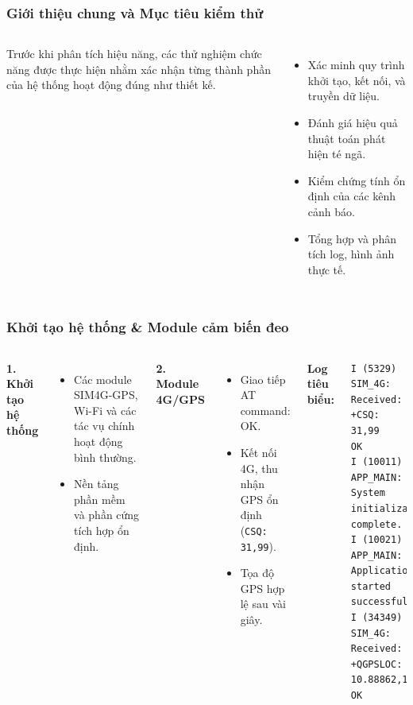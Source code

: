 
\begin{frame}[t]
\frametitle{Giới thiệu chung và Mục tiêu kiểm thử}
\begin{columns}[T]
    Trước khi phân tích hiệu năng, các thử nghiệm chức năng được thực hiện nhằm xác nhận từng thành phần của hệ thống hoạt động đúng như thiết kế.
    \begin{itemize}
        \item Xác minh quy trình khởi tạo, kết nối, và truyền dữ liệu.
        \item Đánh giá hiệu quả thuật toán phát hiện té ngã.
        \item Kiểm chứng tính ổn định của các kênh cảnh báo.
        \item Tổng hợp và phân tích log, hình ảnh thực tế.
    \end{itemize}
\end{columns}
\end{frame}

\begin{frame}[t,fragile]
\frametitle{Khởi tạo hệ thống \& Module cảm biến đeo}
\begin{columns}[T]
    \textbf{1. Khởi tạo hệ thống}
    \begin{itemize}
        \item Các module SIM4G-GPS, Wi-Fi và các tác vụ chính hoạt động bình thường.
        \item Nền tảng phần mềm và phần cứng tích hợp ổn định.
    \end{itemize}
    \vspace{0.2cm}
    \textbf{2. Module 4G/GPS}
    \begin{itemize}
        \item Giao tiếp AT command: OK.
        \item Kết nối 4G, thu nhận GPS ổn định (\texttt{CSQ: 31,99}).
        \item Tọa độ GPS hợp lệ sau vài giây.
    \end{itemize}

    \textbf{Log tiêu biểu:}
    \begin{verbatim}
I (5329) SIM_4G: Received: +CSQ: 31,99
OK
I (10011) APP_MAIN: System initialization complete.
I (10021) APP_MAIN: Application started successfully
I (34349) SIM_4G: Received: +QGPSLOC: 10.88862,106.77975
OK
    \end{verbatim}
\end{columns}
\end{frame}

